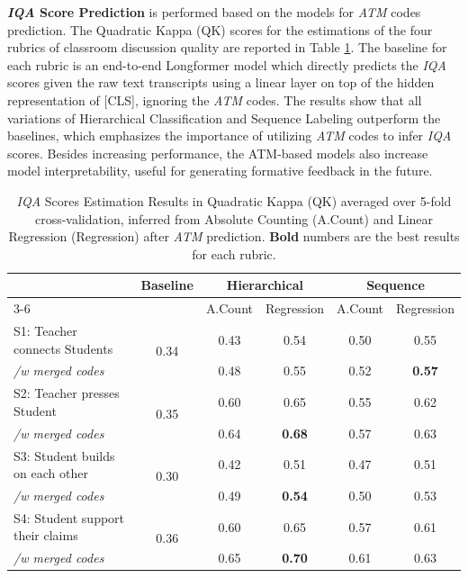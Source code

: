 \documentclass[runningheads]{llncs}
\begin{document}
\textbf{\textit{IQA} Score Prediction} is performed
based on the models for \textit{ATM} codes prediction. The Quadratic Kappa (QK) scores for the estimations of the four rubrics of classroom discussion quality are reported in Table \ref{tab:iqa}. The baseline for each rubric is an end-to-end Longformer model \cite{Longformer} which directly predicts the \textit{IQA}  scores given the raw text transcripts using a linear layer on top of the hidden representation of [CLS], ignoring the \textit{ATM} codes. 
The results show that all %
variations of Hierarchical Classification and Sequence Labeling %
outperform the baselines, which emphasizes the importance of utilizing  \textit{ATM} codes to infer  \textit{IQA}  scores.  Besides increasing performance, the ATM-based models also increase model interpretability, useful for generating formative feedback in the future.\begin{table} [t]
\centering
\caption{\textit{IQA}  Scores Estimation Results in Quadratic Kappa (QK) averaged over 5-fold cross-validation, inferred from Absolute Counting (A.Count) and Linear Regression (Regression) after \textit{ATM} prediction. \textbf{Bold} numbers are the best results for each rubric.}
\label{tab:iqa}
\begin{tabular}{|l|c|c|c|c|c|}
\hline
\hfil \multirow{2}{*}{\textbf{Rubric}} & \multirow{2}{*}{\textbf{Baseline}} & \multicolumn{2}{c|}{\textbf{Hierarchical}} & \multicolumn{2}{c|}{\textbf{Sequence}} \\
\cline{3-6}
& & {A.Count} & {Regression} & {A.Count} & {Regression}\\
\hline
S1: Teacher connects Students & \multirow{2}{*}{0.34} & 0.43 & 0.54 & 0.50 & 0.55 \\
\hspace{4mm} \textit{/w merged codes} & & 0.48 & 0.55 & 0.52 & \textbf{0.57}  \textbf{} \\
\hline
S2: Teacher presses Student & \multirow{2}{*}{0.35} & 0.60  & 0.65 & 0.55 & 0.62\\
\hspace{4mm} \textit{/w merged codes} &  & 0.64 & \textbf{0.68} & 0.57 & 0.63 \\
\hline
S3: Student builds on each other & \multirow{2}{*}{0.30} & 0.42 & 0.51 & 0.47 & 0.51 \\
\hspace{4mm} \textit{/w merged codes} &  & 0.49 & \textbf{0.54} & 0.50 & 0.53 \\
\hline
S4: Student support their claims & \multirow{2}{*}{0.36}  & 0.60 & 0.65 & 0.57 & 0.61 \\
\hspace{4mm} \textit{/w merged codes} &  & 0.65 & \textbf{0.70} & 0.61 & 0.63 \\
\hline
\end{tabular}
\end{table}
\end{document}
